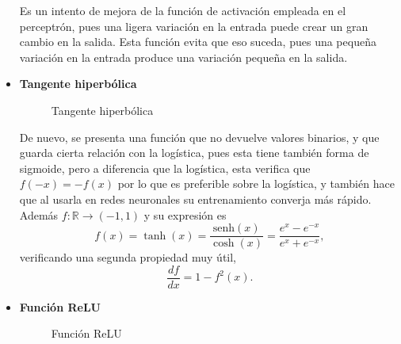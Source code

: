 \begin{itemize}
			Es un intento de mejora de la función de activación empleada en el perceptrón, pues una ligera variación en la entrada puede crear un gran cambio en la salida. Esta función evita que eso suceda, pues una pequeña variación en la entrada produce una variación pequeña en la salida. 
			
			\item \textbf{Tangente hiperbólica}
			\begin{figure}[!h]
				\centering
				\caption{Tangente hiperbólica}
				\label{fig:funcion_tanh}
			\end{figure}
			
			De nuevo, se presenta una función que no devuelve valores binarios, y que guarda cierta relación con la logística, pues esta tiene también forma de sigmoide, pero a diferencia que la logística, esta verifica que $f(-x) = -f(x)$ por lo que es preferible sobre la logística, y también hace que al usarla en redes neuronales su entrenamiento converja más rápido. Además $f: \mathbb{R} \longrightarrow (-1, 1)$ y su expresión es
			$$
			f(x) = \tanh(x) = \frac{\text{senh}(x)}{\cosh(x)} = \frac{e^x - e^{-x}}{e^x + e^{-x}}, 
			$$
			verificando una segunda propiedad muy útil, 
			$$
			\frac{df}{dx} = 1 - f^2(x). 
			$$
			
			\item \textbf{Función ReLU}
			
			\begin{figure}[!h]
				\centering
				\caption{Función ReLU}
				\label{fig:funcion_relu}
			\end{figure}
			

\end{itemize}
